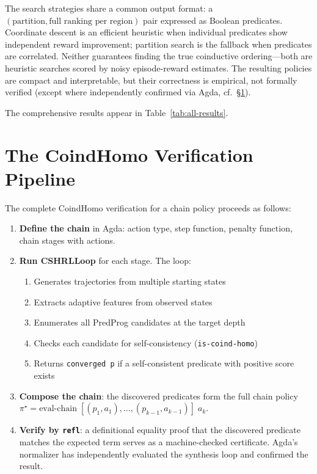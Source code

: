 \documentclass[9pt,a4paper]{article}
\theoremstyle{plain}
\theoremstyle{definition}
\theoremstyle{remark}
\begin{document}
The search strategies share a common output format: a
$(\text{partition}, \text{full ranking per region})$ pair
expressed as Boolean predicates.  Coordinate descent is an
efficient heuristic when individual predicates show independent
reward improvement; partition search is the fallback when
predicates are correlated.  Neither guarantees finding the true
coinductive ordering---both are heuristic searches scored by
noisy episode-reward estimates.  The resulting policies are
compact and interpretable, but their correctness is empirical,
not formally verified (except where independently confirmed
via Agda, cf.\ \S\ref{sec:pipeline}).

The comprehensive results appear in Table~\ref{tab:all-results}.

\section{The CoindHomo Verification Pipeline}
\label{sec:pipeline}

The complete CoindHomo verification for a chain policy proceeds as
follows:

\begin{enumerate}
\item \textbf{Define the chain} in Agda: action type, step function,
      penalty function, chain stages with actions.
\item \textbf{Run CSHRLLoop} for each stage. The loop:
  \begin{enumerate}
    \item Generates trajectories from multiple starting states
    \item Extracts adaptive features from observed states
    \item Enumerates all PredProg candidates at the target depth
    \item Checks each candidate for self-consistency
          (\texttt{is-coind-homo})
    \item Returns \texttt{converged p} if a self-consistent predicate
          with positive score exists
  \end{enumerate}
\item \textbf{Compose the chain}: the discovered predicates form
      the full chain policy $\pi^\star = \text{eval-chain}
      \;[(p_1, a_1), \ldots, (p_{k-1}, a_{k-1})]\;a_k$.
\item \textbf{Verify by \texttt{refl}}: a definitional equality proof
      that the discovered predicate matches the expected term serves
      as a machine-checked certificate. Agda's normalizer has
      independently evaluated the synthesis loop and confirmed the
      result.
\end{enumerate}
\end{document}
